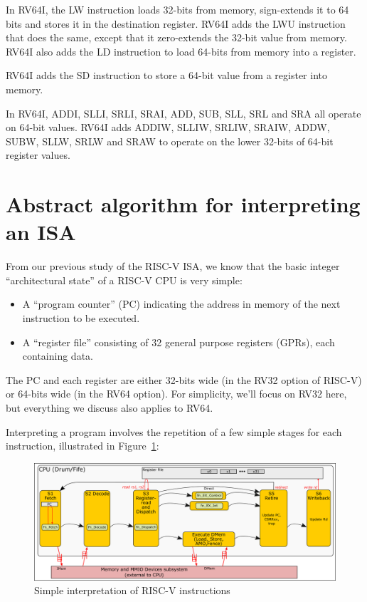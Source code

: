In RV64I, the LW instruction loads 32-bits from memory, sign-extends
it to 64 bits and stores it in the destination register.  RV64I adds
the LWU instruction that does the same, except that it zero-extends
the 32-bit value from memory.  RV64I also adds the LD instruction to
load 64-bits from memory into a register.

RV64I adds the SD instruction to store a 64-bit value from a register
into memory.

In RV64I, ADDI, SLLI, SRLI, SRAI, ADD, SUB, SLL, SRL and SRA all
operate on 64-bit values.  RV64I adds ADDIW, SLLIW, SRLIW, SRAIW,
ADDW, SUBW, SLLW, SRLW and SRAW to operate on the lower 32-bits of
64-bit register values.


\section{Abstract algorithm for interpreting an ISA}

\label{Sec_ISA_Exec_Algorithm}


From our previous study of the RISC-V ISA, we know that the basic
integer ``architectural state'' of a RISC-V CPU is very simple:

\begin{itemize}

\item A ``program counter'' (PC) indicating the address in memory of
the next instruction to be executed.

\item A ``register file'' consisting of 32 general purpose registers
(GPRs), each containing data.

\end{itemize}

The PC and each register are either 32-bits wide (in the RV32 option
of RISC-V) or 64-bits wide (in the RV64 option).  For simplicity,
we'll focus on RV32 here, but everything we discuss also applies to
RV64.

Interpreting a program involves the repetition of a few simple stages
for each instruction, illustrated in Figure~\ref{Fig_Instr_Exec}:
\begin{figure}[htbp]
  \centerline{\includegraphics[width=6in,angle=0]{Figures/RSN_2025-09-01.000.00_FifeDrum_Stages_Multilayer_L1}}
  \caption{\label{Fig_Instr_Exec}Simple interpretation of RISC-V instructions}
\end{figure}

